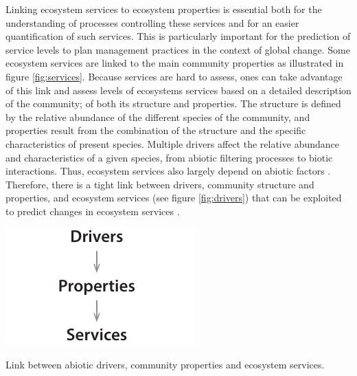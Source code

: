 

Linking ecosystem services to ecosystem properties is essential both for the understanding of processes controlling these services and for an easier quantification of such services. This is particularly important for the prediction of service levels to plan management practices in the context of global change. Some ecosystem services are linked to the main community properties as illustrated in figure  \ref{fig:services}. Because services are hard to assess, ones can take advantage of this link and assess levels of ecosystems services based on a detailed description of the community; of both its structure and properties. The structure is defined by the relative abundance of the different species of the community, and properties result from the combination of the structure and the specific characteristics of present species. Multiple drivers affect the relative abundance and characteristics of a given species, from abiotic filtering processes to biotic interactions. Thus, ecosystem services also largely depend on abiotic factors \parencite{lavorel_predicting_2002}. Therefore, there is a tight link between drivers, community structure and properties, and ecosystem services (see figure \ref{fig:drivers}) that can be exploited to predict changes in ecosystem services \parencite{lamarque_plant_2014}. 


\begin{marginfigure}
    \includegraphics{./1_Introduction/graphics/drivers_properties_services_m.pdf}
  \caption[Drivers to services]{Link between abiotic drivers, community properties and ecosystem services.}
  \label{fig:drivers}
\end{marginfigure}

